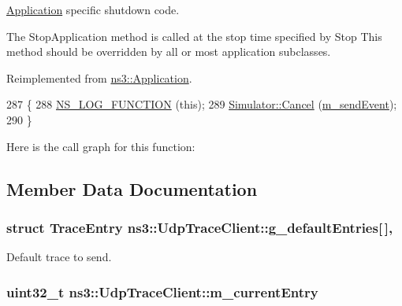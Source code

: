 \hyperlink{classns3_1_1Application}{Application} specific shutdown code. 

The Stop\+Application method is called at the stop time specified by Stop This method should be overridden by all or most application subclasses. 

Reimplemented from \hyperlink{classns3_1_1Application_aea844f3c114b1faf8de1faf5127ea8b4}{ns3\+::\+Application}.


\begin{DoxyCode}
287 \{
288   \hyperlink{log-macros-disabled_8h_a90b90d5bad1f39cb1b64923ea94c0761}{NS\_LOG\_FUNCTION} (\textcolor{keyword}{this});
289   \hyperlink{classns3_1_1Simulator_a1b903a62d6117ef28f7ba3c6500689bf}{Simulator::Cancel} (\hyperlink{structns3_1_1UdpTraceClient_a0190e0401d6d08774bdf89ccc4799a28}{m\_sendEvent});
290 \}
\end{DoxyCode}


Here is the call graph for this function\+:




\subsection{Member Data Documentation}
\subsubsection[{\texorpdfstring{g\+\_\+default\+Entries}{g_defaultEntries}}]{\setlength{\rightskip}{0pt plus 5cm}struct {\bf Trace\+Entry} ns3\+::\+Udp\+Trace\+Client\+::g\+\_\+default\+Entries\mbox{[}$\,$\mbox{]}\hspace{0.3cm}{\ttfamily [static]}, {\ttfamily [private]}}\hypertarget{structns3_1_1UdpTraceClient_ac64efa8d08c449e13e6b74c83111674f}{}\label{structns3_1_1UdpTraceClient_ac64efa8d08c449e13e6b74c83111674f}


Default trace to send. 

\subsubsection[{\texorpdfstring{m\+\_\+current\+Entry}{m_currentEntry}}]{\setlength{\rightskip}{0pt plus 5cm}uint32\+\_\+t ns3\+::\+Udp\+Trace\+Client\+::m\+\_\+current\+Entry\hspace{0.3cm}{\ttfamily [private]}}\hypertarget{structns3_1_1UdpTraceClient_a2b4e8272143ce09fb70f32ae44bb3a55}{}\label{structns3_1_1UdpTraceClient_a2b4e8272143ce09fb70f32ae44bb3a55}


